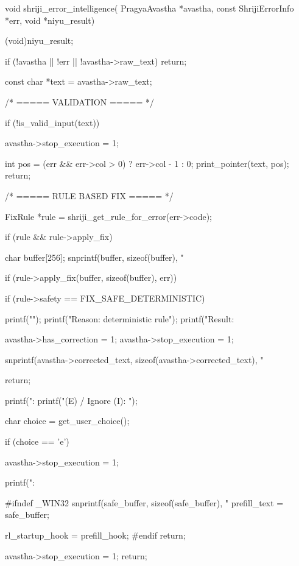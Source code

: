 \documentclass{article}
\begin{document}
void shriji_error_intelligence(
    PragyaAvastha *avastha,
    const ShrijiErrorInfo *err,
    void *niyu_result)
{
    (void)niyu_result;

    if (!avastha || !err || !avastha->raw_text)
        return;

    const char *text = avastha->raw_text;

    /* ===== VALIDATION ===== */

    if (!is_valid_input(text))
    {
        avastha->stop_execution = 1;

        int pos = (err && err->col > 0) ? err->col - 1 : 0;
        print_pointer(text, pos);
        return;
    }

    /* ===== RULE BASED FIX ===== */

    FixRule *rule = shriji_get_rule_for_error(err->code);

    if (rule && rule->apply_fix)
    {
        char buffer[256];
        snprintf(buffer, sizeof(buffer), "%

        if (rule->apply_fix(buffer, sizeof(buffer), err))
        {
            if (rule->safety == FIX_SAFE_DETERMINISTIC)
            {
                printf("\n");
                printf("Reason: deterministic rule\n");
                printf("Result: %

                avastha->has_correction = 1;
                avastha->stop_execution = 1;

                snprintf(avastha->corrected_text,
                         sizeof(avastha->corrected_text),
                         "%

                return;
            }

            printf("\nSuggestion: %
            printf("\nEdit (E) / Ignore (I): ");

            char choice = get_user_choice();

            if (choice == 'e')
            {
                avastha->stop_execution = 1;

                printf("\nEdit:\n%

#ifndef _WIN32
                snprintf(safe_buffer, sizeof(safe_buffer), "%
                prefill_text = safe_buffer;

                rl_startup_hook = prefill_hook;
#endif
                return;
            }

            avastha->stop_execution = 1;
            return;
        }
    }

}
\end{document}
